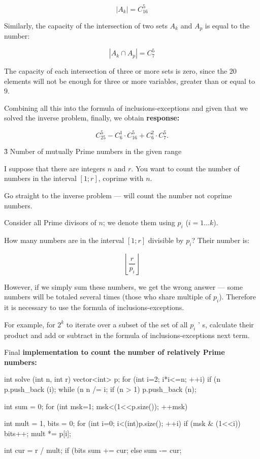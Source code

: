 $$ | A_k | = C_{16}^5 $$

Similarly, the capacity of the intersection of two sets $A_k$ and $A_p$ is equal to the number:

$$ \left| A_k \cap A_p \right| = C_7^5 $$

The capacity of each intersection of three or more sets is zero, since the $20$ elements will not be enough for three or more variables, greater than or equal to $9$.

Combining all this into the formula of inclusions-exceptions and given that we solved the inverse problem, finally, we obtain \bf{response}:

$$ C_{25}^5 - C_6^1 \cdot C_{16}^5 + C_6^2 \cdot C_7^5. $$


\h3{ Number of mutually Prime numbers in the given range }

I suppose that there are integers $n$ and $r$. You want to count the number of numbers in the interval $[1; r]$, coprime with $n$.

Go straight to the inverse problem --- will count the number not coprime numbers.

Consider all Prime divisors of $n$; we denote them using $p_i$ ($i = 1 \ldots k$).

How many numbers are in the interval $[1;r]$ divisible by $p_i$? Their number is:

$$ \left\lfloor \frac{ r }{ p_i } \right\rfloor $$

However, if we simply sum these numbers, we get the wrong answer --- some numbers will be totaled several times (those who share multiple of $p_i$). Therefore it is necessary to use the formula of inclusions-exceptions.

For example, for $2^k$ to iterate over a subset of the set of all $p_i$ ' s, calculate their product and add or subtract in the formula of inclusions-exceptions next term.

Final \bf{implementation} to count the number of relatively Prime numbers:

\code
int solve (int n, int r) {
vector<int> p;
for (int i=2; i*i<=n; ++i)
if (n %
p.push_back (i);
while (n %
n /= i;
}
if (n > 1)
p.push_back (n);

int sum = 0;
for (int msk=1; msk<(1<<p.size()); ++msk) {
int mult = 1,
bits = 0;
for (int i=0; i<(int)p.size(); ++i)
if (msk & (1<<i)) {
bits++;
mult *= p[i];
}

int cur = r / mult;
if (bits %
sum += cur;
else
sum -= cur;
}

